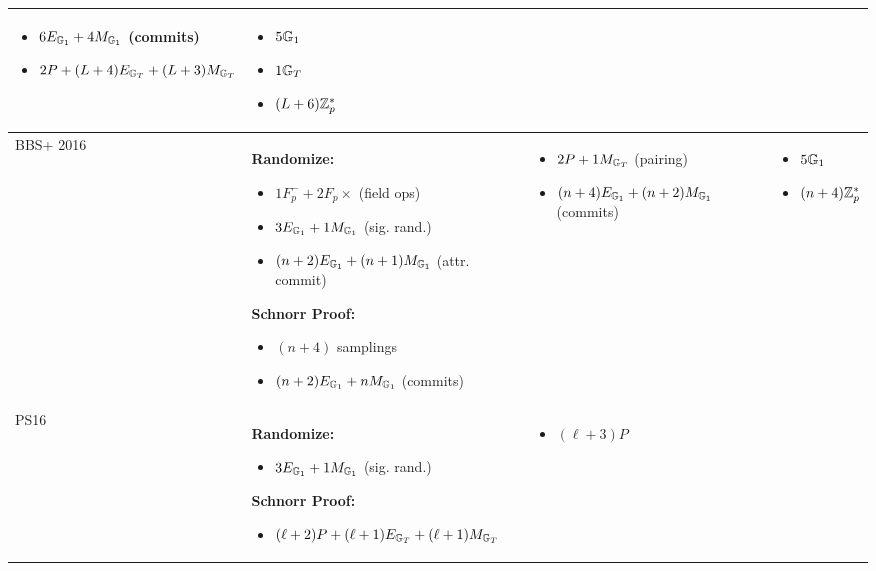 \begin{tabular}{|l|p{4.5cm}|p{4.5cm}|p{3.5cm}|}
\begin{itemize}[nosep]
        \item $6E_{\mathbb{G}_1} + 4M_{\mathbb{G}_1}$ (commits)
        \item $2P + (L+4)E_{\mathbb{G}_T} + (L+3)M_{\mathbb{G}_T}$
    \end{itemize}
    &
    \begin{itemize}[nosep]
        \item $5\mathbb{G}_1$
        \item $1\mathbb{G}_T$
        \item $(L+6)\mathbb{Z}_p^*$
    \end{itemize}
    \\
    \hline
    BBS+ 2016 &
    \textbf{Randomize:}
    \begin{itemize}[nosep]
        \item $1F_p^- + 2F_p\times$ (field ops)
        \item $3E_{\mathbb{G}_1} + 1M_{\mathbb{G}_1}$ (sig. rand.)
        \item $(n+2)E_{\mathbb{G}_1} + (n+1)M_{\mathbb{G}_1}$ (attr. commit)
    \end{itemize}
    \textbf{Schnorr Proof:}
    \begin{itemize}[nosep]
        \item $(n+4)$ samplings
        \item $(n+2)E_{\mathbb{G}_1} + nM_{\mathbb{G}_1}$ (commits)
    \end{itemize}
    &
    \begin{itemize}[nosep]
        \item $2P + 1M_{\mathbb{G}_T}$ (pairing)
        \item $(n+4)E_{\mathbb{G}_1} + (n+2)M_{\mathbb{G}_1}$ (commits)
    \end{itemize}
    &
    \begin{itemize}[nosep]
        \item $5\mathbb{G}_1$
        \item $(n+4)\mathbb{Z}_p^*$
    \end{itemize}
    \\
    \hline
    PS16 & 
    \textbf{Randomize:}
    \begin{itemize}[nosep]
        \item $3E_{\mathbb{G}_1} + 1M_{\mathbb{G}_1}$ (sig. rand.)
    \end{itemize}
    \textbf{Schnorr Proof:}
    \begin{itemize}[nosep]
        \item $(\ell+2)P + (\ell+1)E_{\mathbb{G}_T} + (\ell+1)M_{\mathbb{G}_T}$
    \end{itemize}
    & 
    \begin{itemize}[nosep]
        \item $(\ell+3)P$

\end{itemize}
\end{tabular}
